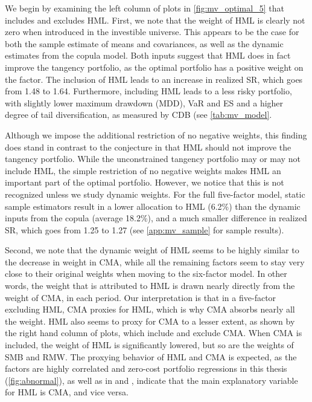 We begin by examining the left column of plots in \autoref{fig:mv_optimal_5} that includes and excludes HML. First, we note that the weight of HML is clearly not zero when introduced in the investible universe. This appears to be the case for both the sample estimate of means and covariances, as well as the dynamic estimates from the copula model. Both inputs suggest that HML does in fact improve the tangency portfolio, as the optimal portfolio has a positive weight on the factor. The inclusion of HML leads to an increase in realized SR, which goes from 1.48 to 1.64. Furthermore, including HML leads to a less risky portfolio, with slightly lower maximum drawdown (MDD), VaR and ES and a higher degree of tail diversification, as measured by CDB (see \autoref{tab:mv_model}.

Although we impose the additional restriction of no negative weights, this finding does stand in contrast to the conjecture in \textcite{FF2015} that HML should not improve the tangency portfolio. While the unconstrained tangency portfolio may or may not include HML, the simple restriction of no negative weights makes HML an important part of the optimal portfolio. However, we notice that this is not recognized unless we study dynamic weights. For the full five-factor model, static sample estimators result in a lower allocation to HML (6.2\%) than the dynamic inputs from the copula (average 18.2\%), and a much smaller difference in realized SR, which goes from 1.25 to 1.27 (see \autoref{app:mv_sample} for sample results).

Second, we note that the dynamic weight of HML seems to be highly similar to the decrease in weight in CMA, while all the remaining factors seem to stay very close to their original weights when moving to the six-factor model. In other words, the weight that is attributed to HML is drawn nearly directly from the weight of CMA, in each period. Our interpretation is that in a five-factor excluding HML, CMA proxies for HML, which is why CMA absorbs nearly all the weight. HML also seems to proxy for CMA to a lesser extent, as shown by the right hand column of plots, which include and exclude CMA. When CMA is included, the weight of HML is significantly lowered, but so are the weights of SMB and RMW. The proxying behavior of HML and CMA is expected, as the factors are highly correlated and zero-cost portfolio regressions in this thesis (\autoref{fig:abnormal}), as well as in \textcite{FF2015} and \textcite{Asness2015}, indicate that the main explanatory variable for HML is CMA, and vice versa.

